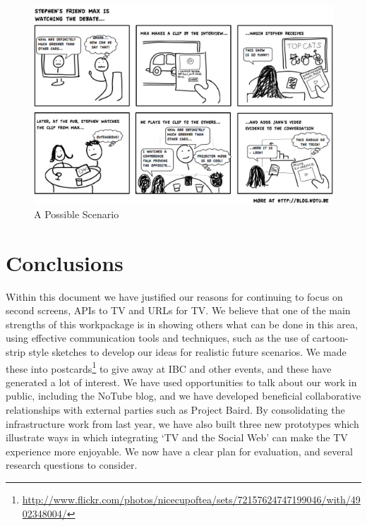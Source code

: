 \documentclass{notube}
\begin{document}
\begin{figure}[htbp]
\begin{center}
\includegraphics[width=6in]{images/postcard3.png}
\caption{A Possible Scenario} \label{fig:postcard3}
\end{center}
\end{figure}


\chapter{Conclusions}


Within this document we have justified our reasons for continuing to focus on second screens, APIs to TV and URLs for TV. We believe that one of the main strengths of this workpackage is in showing others what can be done in this area, using effective communication tools and techniques, such as the use of cartoon-strip style sketches to develop our ideas for realistic future scenarios. We made these into postcards\footnote{\url{http://www.flickr.com/photos/nicecupoftea/sets/72157624747199046/with/4902348004/}} to give away at IBC and other events, and these have generated a lot of interest. We have used opportunities to talk about our work in public, including the NoTube blog, and we have developed beneficial collaborative relationships with external parties such as Project Baird. By consolidating the infrastructure work from last year, we have also built three new prototypes which illustrate ways in which integrating `TV and the Social Web' can make the TV experience more enjoyable. We now have a clear plan for evaluation, and several research questions to consider.
 
\end{document}
